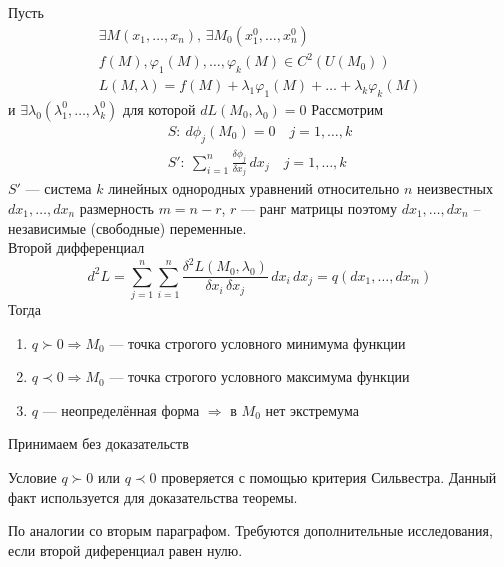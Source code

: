 \begin{Th}
    Пусть 
    \begin{gather*}
        \exists M(x_1, \dots, x_n), \, \exists M_0(x^0_1, \dots, x^0_n)\\
        f(M), \varphi_1(M), \dots, \varphi_k(M) \in C^2(U(M_0))\\
        L(M, \lambda) = f(M) + \lambda_1\varphi_1(M) + \dots + \lambda_k\varphi_k(M) 
    \end{gather*}
    и $\exists \lambda_0(\lambda^0_1, \dots, \lambda^0_k)$ для которой $ dL(M_0, \lambda_0) = 0 $ Рассмотрим
    \begin{gather*}
        S:\: d\phi_j(M_0) = 0 \quad j = 1, \dots, k\\
        S':\: \sum_{i=1}^{n} \frac{\delta\phi_j}{\delta x_j}\,dx_j \quad j = 1, \dots, k
    \end{gather*}
    $S'$ --- система $k$ линейных однородных уравнений относительно $n$ неизвестных $dx_1, \dots, dx_n$ размерность $m = n - r$, $r$ --- ранг матрицы поэтому $dx_1, \dots, dx_n$ -- независимые (свободные) переменные.\\
    Второй дифференциал 
    \[
        d^2L = \sum_{j = 1}^{n}\sum_{i = 1}^{n} \frac{\delta^2L(M_0, \lambda_0)}{\delta x_i\, \delta x_j}\, dx_i\, dx_j = q(dx_1, \dots, dx_m)
    \]
    Тогда
    \begin{enumerate}
        \item $q \succ 0 \Rightarrow M_0$ --- точка строгого условного минимума функции
        
        \item $q \prec 0 \Rightarrow M_0$ --- точка строгого условного максимума функции
        
        \item $q$ --- неопределённая форма $\Rightarrow$ в $M_0$ нет экстремума 
    \end{enumerate}
\end{Th}

\begin{Proof}
    Принимаем без доказательств
\end{Proof}

\begin{Note}
    Условие $q \succ 0$ или $q \prec 0$ проверяется с помощью критерия Сильвестра. Данный факт используется для доказательства теоремы. 
\end{Note}

\begin{Note}
    По аналогии со вторым параграфом. Требуются дополнительные исследования, если второй диференциал равен нулю.
\end{Note}

